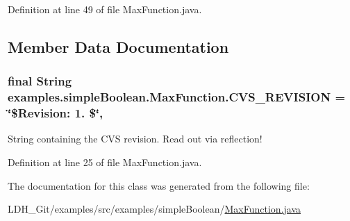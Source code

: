 Definition at line 49 of file Max\-Function.\-java.



\subsection{Member Data Documentation}
\hypertarget{classexamples_1_1simple_boolean_1_1_max_function_a648bd5b1591f4a6fbf1dea0577de220d}{
\subsubsection[{C\-V\-S\-\_\-\-R\-E\-V\-I\-S\-I\-O\-N}]{\setlength{\rightskip}{0pt plus 5cm}final String examples.\-simple\-Boolean.\-Max\-Function.\-C\-V\-S\-\_\-\-R\-E\-V\-I\-S\-I\-O\-N = \char`\"{}\$Revision\-: 1. \$\char`\"{}\hspace{0.3cm}{\ttfamily [static]}, {\ttfamily [private]}}}\label{classexamples_1_1simple_boolean_1_1_max_function_a648bd5b1591f4a6fbf1dea0577de220d}
String containing the C\-V\-S revision. Read out via reflection! 

Definition at line 25 of file Max\-Function.\-java.



The documentation for this class was generated from the following file\-:\begin{DoxyCompactItemize}
\item 
L\-D\-H\-\_\-\-Git/examples/src/examples/simple\-Boolean/\hyperlink{examples_2src_2examples_2simple_boolean_2_max_function_8java}{Max\-Function.\-java}\end{DoxyCompactItemize}
